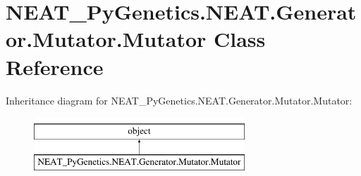 \hypertarget{class_n_e_a_t___py_genetics_1_1_n_e_a_t_1_1_generator_1_1_mutator_1_1_mutator}{}\section{N\+E\+A\+T\+\_\+\+Py\+Genetics.\+N\+E\+A\+T.\+Generator.\+Mutator.\+Mutator Class Reference}
\label{class_n_e_a_t___py_genetics_1_1_n_e_a_t_1_1_generator_1_1_mutator_1_1_mutator}
Inheritance diagram for N\+E\+A\+T\+\_\+\+Py\+Genetics.\+N\+E\+A\+T.\+Generator.\+Mutator.\+Mutator\+:\begin{figure}[H]
\begin{center}
\leavevmode
\includegraphics[height=2.000000cm]{class_n_e_a_t___py_genetics_1_1_n_e_a_t_1_1_generator_1_1_mutator_1_1_mutator}
\end{center}
\end{figure}
